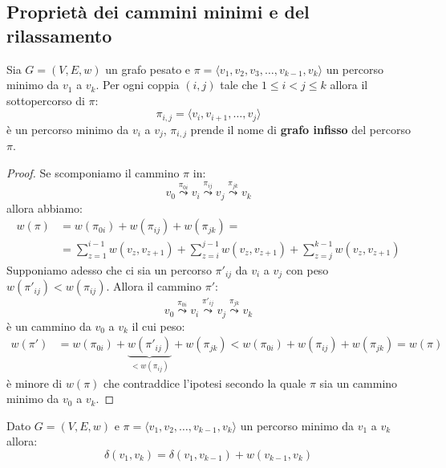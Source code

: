 \subsection{Proprietà dei cammini minimi e del rilassamento}


\begin{lemmabox}
		Sia $G=(V,E,w)$ un grafo pesato e $\pi = \langle v_{1}, v_{2}, v_{3}, \ldots, v_{k-1}, v_{k} \rangle $ un percorso minimo da $v_{1}$ a $v_{k}$. Per ogni coppia $(i,j)$ tale che $1 \leq i < j \leq k$ allora il sottopercorso di $\pi$:
	\[\pi_{i,j}= \langle v_{i},v_{i+1},\ldots,v_{j}\rangle\]
	è un percorso minimo da $v_{i}$ a $v_{j}$, $\pi_{i,j}$ prende il nome di \textbf{grafo infisso} del percorso $\pi$.
\end{lemmabox}
\begin{proof}
	Se scomponiamo il cammino $\pi$ in:
\begin{displaymath}
	v_{0} \stackrel{\pi_{0i}}{\leadsto} v_{i} \stackrel{\pi_{ij}}{\leadsto} v_{j} \stackrel{\pi_{jk}}{\leadsto}v_{k}
\end{displaymath}
allora abbiamo:
\begin{align*}
	w(\pi) & = w(\pi_{0i} ) + w(\pi_{ij}) + w(\pi_{jk}) = \\
	&= \sum_{z=1}^{i-1} w(v_{z},v_{z+1}) + \sum_{z=i}^{j-1}w(v_{z},v_{z+1}) + \sum_{z=j}^{k-1}w(v_{z},v_{z+1})
\end{align*}
Supponiamo adesso che ci sia un percorso $\pi'_{ij}$ da $v_{i}$ a $v_{j}$ con peso $w(\pi'_{ij})<w(\pi_{ij})$. Allora il cammino $\pi'$:
\[v_{0} \stackrel{\pi_{0i}}{\leadsto} v_{i} \stackrel{\pi'_{ij}}{\leadsto} v_{j} \stackrel{\pi_{jk}}{\leadsto}v_{k}\] è un cammino da $v_{0}$  a $v_{k}$ il cui peso:
\begin{align*}
	w(\pi') & = w(\pi_{0i} ) +\underbrace{ w(\pi'_{ij})}_{<w(\pi_{ij})} + w(\pi_{jk}) < w(\pi_{0i} ) + w(\pi_{ij}) + w(\pi_{jk}) = w(\pi)
\end{align*}
è minore di $w(\pi)$ che contraddice l'ipotesi secondo la quale $\pi$ sia un cammino minimo da $v_{0}$ a $v_{k}$.
\end{proof}

\begin{corolbox}
		Dato $G=(V,E,w)$ e $\pi=\langle v_{1},v_{2},\ldots,v_{k-1},v_{k}\rangle$ un percorso minimo da $v_{1}$ a $v_{k}$ allora:
	\begin{equation}
		\delta(v_{1},v_{k}) = \delta(v_{1},v_{k-1}) + w(v_{k-1},v_{k})
	\end{equation}
\end{corolbox}

